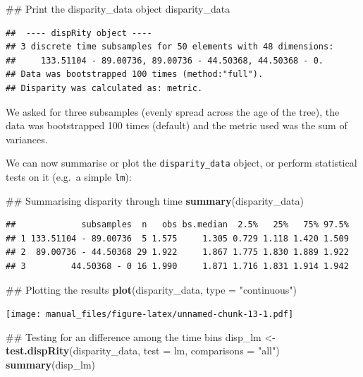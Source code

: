 \documentclass[]{book}
\newenvironment{Shaded}{\begin{snugshade}}{\end{snugshade}}
\newcommand{\KeywordTok}[1]{\textcolor[rgb]{0.13,0.29,0.53}{\textbf{#1}}}
\newcommand{\DataTypeTok}[1]{\textcolor[rgb]{0.13,0.29,0.53}{#1}}
\newcommand{\StringTok}[1]{\textcolor[rgb]{0.31,0.60,0.02}{#1}}
\newcommand{\NormalTok}[1]{#1}
\theoremstyle{definition}
\theoremstyle{definition}
\theoremstyle{remark}
\begin{document}
\begin{Shaded}
\begin{Highlighting}[]
\NormalTok{## Print the disparity_data object}
\NormalTok{disparity_data}
\end{Highlighting}
\end{Shaded}

\begin{verbatim}
##  ---- dispRity object ---- 
## 3 discrete time subsamples for 50 elements with 48 dimensions:
##     133.51104 - 89.00736, 89.00736 - 44.50368, 44.50368 - 0.
## Data was bootstrapped 100 times (method:"full").
## Disparity was calculated as: metric.
\end{verbatim}

We asked for three subsamples (evenly spread across the age of the
tree), the data was bootstrapped 100 times (default) and the metric used
was the sum of variances.

We can now summarise or plot the \texttt{disparity\_data} object, or
perform statistical tests on it (e.g.~a simple \texttt{lm}):

\begin{Shaded}
\begin{Highlighting}[]
\NormalTok{## Summarising disparity through time}
\KeywordTok{summary}\NormalTok{(disparity_data)}
\end{Highlighting}
\end{Shaded}

\begin{verbatim}
##             subsamples  n   obs bs.median  2.5%   25%   75% 97.5%
## 1 133.51104 - 89.00736  5 1.575     1.305 0.729 1.118 1.420 1.509
## 2  89.00736 - 44.50368 29 1.922     1.867 1.775 1.830 1.889 1.922
## 3         44.50368 - 0 16 1.990     1.871 1.716 1.831 1.914 1.942
\end{verbatim}

\begin{Shaded}
\begin{Highlighting}[]
\NormalTok{## Plotting the results}
\KeywordTok{plot}\NormalTok{(disparity_data, }\DataTypeTok{type =} \StringTok{"continuous"}\NormalTok{)}
\end{Highlighting}
\end{Shaded}

\texttt{[image: manual\_files/figure-latex/unnamed-chunk-13-1.pdf]}

\begin{Shaded}
\begin{Highlighting}[]
\NormalTok{## Testing for an difference among the time bins}
\NormalTok{disp_lm <-}\StringTok{ }\KeywordTok{test.dispRity}\NormalTok{(disparity_data, }\DataTypeTok{test =}\NormalTok{ lm, }\DataTypeTok{comparisons =} \StringTok{"all"}\NormalTok{)}
\KeywordTok{summary}\NormalTok{(disp_lm)}
\end{Highlighting}
\end{Shaded}
\end{document}
